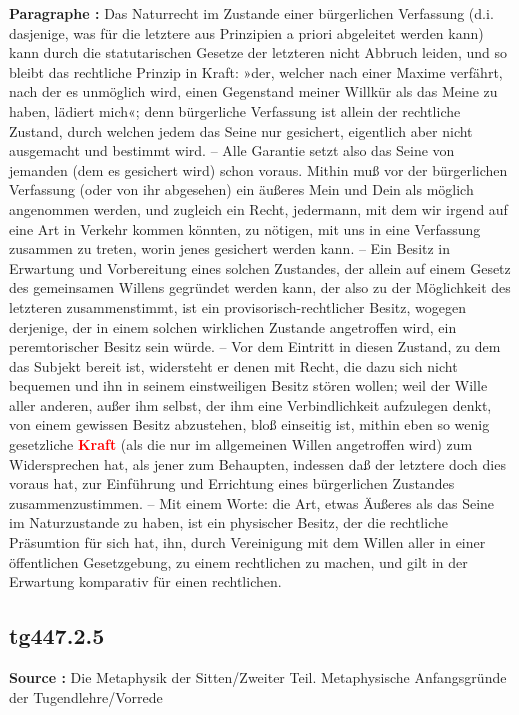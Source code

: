 \documentclass[a4paper,12pt,twoside]{book}
\newcommand{\match}[1]{\textcolor{red}{\textbf{#1}}}
\begin{document}
	\textbf{Paragraphe : }Das Naturrecht im Zustande einer bürgerlichen Verfassung (d.i. dasjenige, was für die letztere aus Prinzipien a priori abgeleitet werden kann) kann durch die statutarischen Gesetze der letzteren nicht Abbruch leiden, und so bleibt das rechtliche Prinzip in Kraft: »der, welcher nach einer Maxime verfährt, nach der es unmöglich wird, einen Gegenstand meiner Willkür als das Meine zu haben, lädiert mich«; denn bürgerliche Verfassung ist allein der rechtliche Zustand, durch welchen jedem das Seine nur gesichert, eigentlich aber nicht ausgemacht und bestimmt wird. – Alle Garantie setzt also das Seine von jemanden (dem es gesichert wird) schon voraus. Mithin muß vor der bürgerlichen Verfassung (oder von ihr abgesehen) ein äußeres Mein und Dein als möglich angenommen werden, und zugleich ein Recht, jedermann, mit dem wir irgend auf eine Art in Verkehr kommen könnten, zu nötigen, mit uns in eine Verfassung zusammen zu treten, worin jenes gesichert werden kann. – Ein Besitz in Erwartung und Vorbereitung eines solchen Zustandes, der allein auf einem Gesetz des gemeinsamen Willens gegründet werden kann, der also zu der Möglichkeit des letzteren zusammenstimmt, ist ein provisorisch-rechtlicher Besitz, wogegen derjenige, der in  einem solchen wirklichen Zustande angetroffen wird, ein peremtorischer Besitz sein würde. – Vor dem Eintritt in diesen Zustand, zu dem das Subjekt bereit ist, widersteht er denen mit Recht, die dazu sich nicht bequemen und ihn in seinem einstweiligen Besitz stören wollen; weil der Wille aller anderen, außer ihm selbst, der ihm eine Verbindlichkeit aufzulegen denkt, von einem gewissen Besitz abzustehen, bloß einseitig ist, mithin eben so wenig gesetzliche \match{Kraft} (als die nur im allgemeinen Willen angetroffen wird) zum Widersprechen hat, als jener zum Behaupten, indessen daß der letztere doch dies voraus hat, zur Einführung und Errichtung eines bürgerlichen Zustandes zusammenzustimmen. – Mit einem Worte: die Art, etwas Äußeres als das Seine im Naturzustande zu haben, ist ein physischer Besitz, der die rechtliche Präsumtion für sich hat, ihn, durch Vereinigung mit dem Willen aller in einer öffentlichen Gesetzgebung, zu einem rechtlichen zu machen, und gilt in der Erwartung komparativ für einen rechtlichen. 
	
	\subsection*{tg447.2.5} 
	\textbf{Source : }Die Metaphysik der Sitten/Zweiter Teil. Metaphysische Anfangsgründe der Tugendlehre/Vorrede\\  
	
\end{document}
